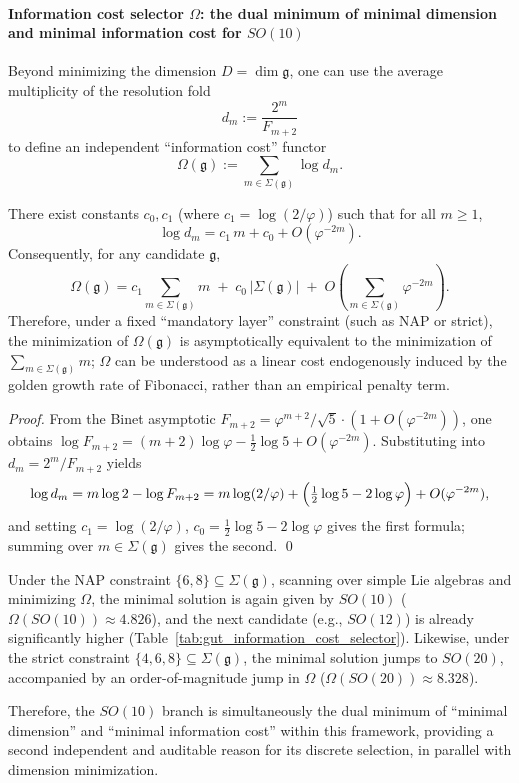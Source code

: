 \paragraph{Information cost selector \texorpdfstring{$\Omega$}{Omega}: the dual minimum of minimal dimension and minimal information cost for \texorpdfstring{$SO(10)$}{SO(10)}}
Beyond minimizing the dimension \(D=\dim\mathfrak g\), one can use the average multiplicity of the resolution fold
\[
d_m:=\frac{2^m}{F_{m+2}}
\]
to define an independent ``information cost'' functor
\[
\Omega(\mathfrak g):=\sum_{m\in\Sigma(\mathfrak g)}\log d_m.
\]
\begin{proposition}\label{prop:gut-omega-linear-action}
There exist constants \(c_0,c_1\) (where \(c_1=\log(2/\varphi)\)) such that for all \(m\ge 1\),
\[
\log d_m
=
c_1\,m+c_0+O(\varphi^{-2m}).
\]
Consequently, for any candidate \(\mathfrak g\),
\[
\Omega(\mathfrak g)
=
c_1\sum_{m\in\Sigma(\mathfrak g)} m
\;+\;
c_0\,|\Sigma(\mathfrak g)|
\;+\;
O\!\left(\sum_{m\in\Sigma(\mathfrak g)}\varphi^{-2m}\right).
\]
Therefore, under a fixed ``mandatory layer'' constraint (such as NAP or strict), the minimization of \(\Omega(\mathfrak g)\) is asymptotically equivalent to the minimization of
\(\sum_{m\in\Sigma(\mathfrak g)} m\); \(\Omega\) can be understood as a linear cost endogenously induced by the golden growth rate of Fibonacci, rather than an empirical penalty term.
\end{proposition}
\begin{proof}
From the Binet asymptotic \(F_{m+2}=\varphi^{m+2}/\sqrt5\cdot(1+O(\varphi^{-2m}))\), one obtains
\(
\log F_{m+2}=(m+2)\log\varphi-\tfrac12\log 5+O(\varphi^{-2m})
\).
Substituting into \(d_m=2^m/F_{m+2}\) yields
\[
\log d_m
=m\log 2-\log F_{m+2}
=m\log(2/\varphi)+\Bigl(\tfrac12\log 5-2\log\varphi\Bigr)+O(\varphi^{-2m}),
\]
and setting \(c_1=\log(2/\varphi)\), \(c_0=\tfrac12\log 5-2\log\varphi\) gives the first formula; summing over \(m\in\Sigma(\mathfrak g)\) gives the second. \qed
\end{proof}
Under the NAP constraint \(\{6,8\}\subseteq\Sigma(\mathfrak g)\), scanning over simple Lie algebras and minimizing \(\Omega\), the minimal solution is again given by \(SO(10)\) (\(\Omega(SO(10))\approx 4.826\)), and the next candidate (e.g., \(SO(12)\)) is already significantly higher (Table~\ref{tab:gut_information_cost_selector}).
Likewise, under the strict constraint \(\{4,6,8\}\subseteq\Sigma(\mathfrak g)\), the minimal solution jumps to \(SO(20)\), accompanied by an order-of-magnitude jump in \(\Omega\) (\(\Omega(SO(20))\approx 8.328\)).

Therefore, the \(SO(10)\) branch is simultaneously the dual minimum of ``minimal dimension'' and ``minimal information cost'' within this framework, providing a second independent and auditable reason for its discrete selection, in parallel with dimension minimization.

